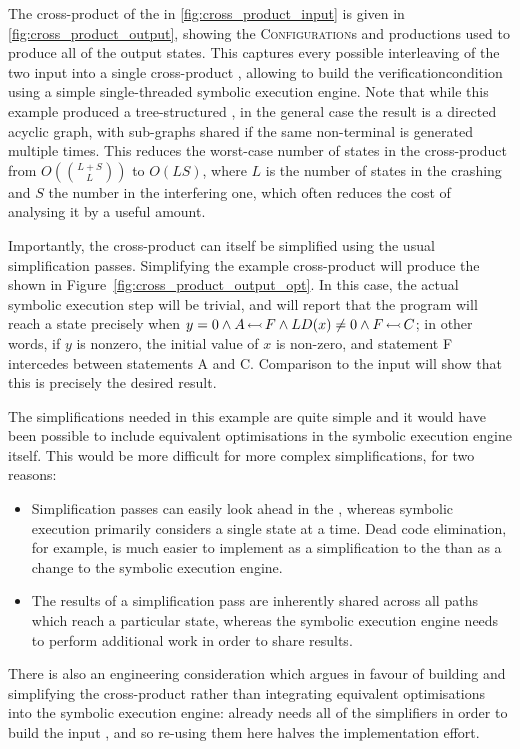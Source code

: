 The cross-product of the {\StateMachines} in
\autoref{fig:cross_product_input} is given in
\autoref{fig:cross_product_output}, showing the
\textsc{Configuration}s and productions used to produce all of the
output states.  This captures every possible interleaving of the two
input {\StateMachines} into a single cross-product {\StateMachine},
allowing {\technique} to build the \gls{verificationcondition} using a
simple single-threaded symbolic execution engine.  Note that while
this example produced a tree-structured {\StateMachine}, in the
general case the result is a directed acyclic graph, with sub-graphs
shared if the same non-terminal is generated multiple times.  This
reduces the worst-case number of states in the cross-product
{\StateMachine} from $O(\binom{L+S}{L})$ to $O(LS)$, where $L$ is the
number of states in the crashing {\StateMachine} and $S$ the number in
the interfering one, which often reduces the cost of analysing it by a
useful amount.

 Importantly, the cross-product {\StateMachine} can itself
be simplified using the usual {\StateMachine} simplification passes.
Simplifying the example cross-product {\StateMachine} will produce the
{\StateMachine} shown in Figure~\ref{fig:cross_product_output_opt}.
In this case, the actual symbolic execution step will be trivial, and
will report that the program will reach a {\stCrash} state precisely
when $y = 0 \wedge A\,{\leftarrowtail}\,F \wedge LD(x) \not= 0 \wedge
F\,{\leftarrowtail}\,C$; in other words, if $y$ is nonzero, the initial
value of $x$ is non-zero, and statement F intercedes between
statements A and C.  Comparison to the input {\StateMachines} will
show that this is precisely the desired result.

The simplifications needed in this example are quite simple and it
would have been possible to include equivalent optimisations in the
symbolic execution engine itself.  This would be more difficult for
more complex simplifications, for two reasons:
\begin{itemize}
\item Simplification passes can easily look ahead in the
  {\StateMachine}, whereas symbolic execution primarily considers a
  single state at a time.  Dead code elimination, for example, is much
  easier to implement as a simplification to the {\StateMachine} than
  as a change to the symbolic execution engine.
\item The results of a simplification pass are inherently shared
  across all paths which reach a particular state, whereas the
  symbolic execution engine needs to perform additional work in order
  to share results.
\end{itemize}
There is also an engineering consideration which argues in favour of
building and simplifying the cross-product {\StateMachine} rather than
integrating equivalent optimisations into the symbolic execution
engine: {\implementation} already needs all of the simplifiers in
order to build the input {\StateMachines}, and so re-using them here
halves the implementation effort.

